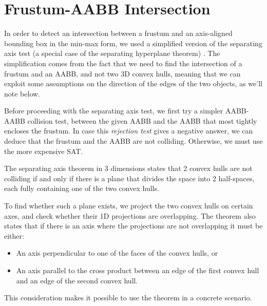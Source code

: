 \documentclass{PoliMi_MasterThesis}
\begin{document}
\section{Frustum-AABB Intersection} \label{sec:frustum_aabb_intersection}
In order to detect an intersection between a frustum and an axis-aligned bounding box in the min-max form, we used a simplified version of the separating axis test (a special case of the separating hyperplane theorem) \cite{separating_axis_test}. The simplification comes from the fact that we need to find the intersection of a frustum and an AABB, and not two 3D convex hulls, meaning that we can exploit some assumptions on the direction of the edges of the two objects, as we'll note below.

Before proceeding with the separating axis test, we first try a simpler AABB-AABB collision test, between the given AABB and the AABB that most tightly encloses the frustum. In case this \textit{rejection test} gives a negative answer, we can deduce that the frustum and the AABB are not colliding. Otherwise, we must use the more expensive SAT.

The separating axis theorem in 3 dimensions states that 2 convex hulls are not colliding if and only if there is a plane that divides the space into 2 half-spaces, each fully containing one of the two convex hulls.

To find whether such a plane exists, we project the two convex hulls on certain axes, and check whether their 1D projections are overlapping. The theorem also states that if there is an axis where the projections are not overlapping it must be either:
\begin{itemize}
	\item An axis perpendicular to one of the faces of the convex hulls, or
	\item An axis parallel to the cross product between an edge of the first convex hull and an edge of the second convex hull.
\end{itemize}
This consideration makes it possible to use the theorem in a concrete scenario.
\end{document}
